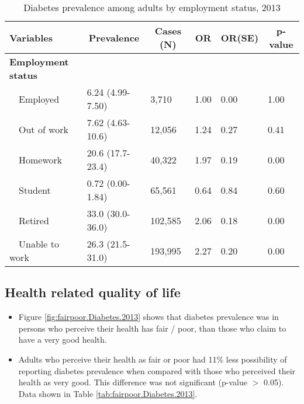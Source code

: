 \begin{table}[H]
\caption{Diabetes prevalence  among adults by employment status, 2013\label{tab:employ.Diabetes.2013}} 
\begin{center}
\begin{tabular}{llllll}
\hline\hline
\multicolumn{1}{l}{Variables}&\multicolumn{1}{c}{Prevalence}&\multicolumn{1}{c}{Cases (N)}&\multicolumn{1}{c}{OR}&\multicolumn{1}{c}{OR(SE)}&\multicolumn{1}{c}{p-value}\tabularnewline
\hline
{\bfseries Employment status}&&&&&\tabularnewline
~~Employed&6.24 (4.99-7.50)&  3,710&1.00&0.00&1.00\tabularnewline
~~Out of work&7.62 (4.63-10.6)& 12,056&1.24&0.27&0.41\tabularnewline
~~Homework&20.6 (17.7-23.4)& 40,322&1.97&0.19&0.00\tabularnewline
~~Student&0.72 (0.00-1.84)& 65,561&0.64&0.84&0.60\tabularnewline
~~Retired&33.0 (30.0-36.0)&102,585&2.06&0.18&0.00\tabularnewline
~~Unable to work&26.3 (21.5-31.0)&193,995&2.27&0.20&0.00\tabularnewline
\hline
\end{tabular}\end{center}

\end{table}


 \newpage
\subsection{Health related quality of life}


 \begin{itemize}

\item Figure \ref{fig:fairpoor.Diabetes.2013} shows that diabetes prevalence  was 
 in persons who perceive their health has fair / poor,
than those who claim to have a very good health.

\item Adults who perceive their health as fair or poor had 11\% less possibility of reporting diabetes prevalence when compared with those who perceived their health as very good. This difference was not significant (p-value $>$ 0.05). Data shown in Table \ref{tab:fairpoor.Diabetes.2013}.

\end{itemize}

